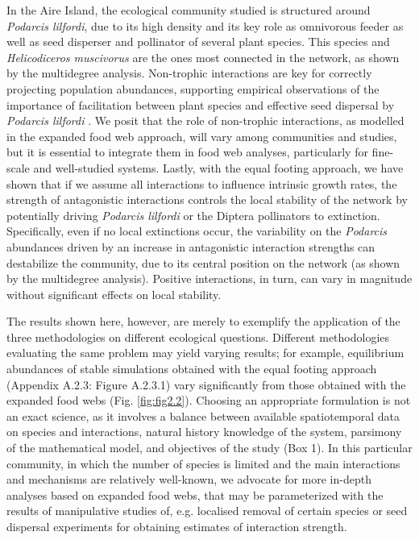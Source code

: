 In the Aire Island, the ecological community studied is structured around \textit{Podarcis lilfordi}, due to its high density and its key role as omnivorous feeder as well as seed disperser and pollinator of several plant species. This species and \textit{Helicodiceros muscivorus} are the ones most connected in the network, as shown by the multidegree analysis. Non-trophic interactions are key for correctly projecting population abundances, supporting empirical observations of the importance of facilitation between plant species \citep{Perez-Mellado2006} and effective seed dispersal by \textit{Podarcis lilfordi} \citep{Perez-Mellado2000}. We posit that the role of non-trophic interactions, as modelled in the expanded food web approach, will vary among communities and studies, but it is essential to integrate them in food web analyses, particularly for fine-scale and well-studied systems. Lastly, with the equal footing approach, we have shown that if we assume all interactions to influence intrinsic growth rates, the strength of antagonistic interactions controls the local stability of the network by potentially driving \textit{Podarcis lilfordi} or the Diptera pollinators to extinction. Specifically, even if no local extinctions occur, the variability on the \textit{Podarcis} abundances driven by an increase in antagonistic interaction strengths can destabilize the community, due to its central position on the network (as shown by the multidegree analysis). Positive interactions, in turn, can vary in magnitude without significant effects on local stability.

The results shown here, however, are merely to exemplify the application of the three methodologies on different ecological questions. Different methodologies evaluating the same problem may yield varying results; for example, equilibrium abundances of stable simulations obtained with the equal footing approach (Appendix A.2.3: Figure A.2.3.1) vary significantly from those obtained with the expanded food webs (Fig. \ref{fig:fig2.2}). Choosing an appropriate formulation is not an exact science, as it involves a balance between available spatiotemporal data on species and interactions, natural history knowledge of the system, parsimony of the mathematical model, and objectives of the study (Box 1). In this particular community, in which the number of species is limited and the main interactions and mechanisms are relatively well-known, we advocate for more in-depth analyses based on expanded food webs, that may be parameterized with the results of manipulative studies of, e.g. localised removal of certain species or seed dispersal experiments for obtaining estimates of interaction strength.

